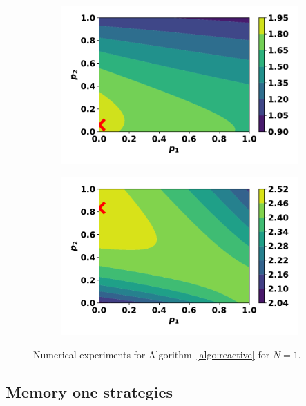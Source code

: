 \documentclass[10pt]{article}
\begin{document}
\begin{figure}
    \centering
    \begin{subfigure}{0.45\textwidth}
        \centering
        \includegraphics[width=.95\textwidth]{img/reactive_pairwise_one.pdf}
    \end{subfigure}
    \begin{subfigure}{0.45\textwidth}
        \centering
        \includegraphics[width=.95\textwidth]{img/reactive_pairwise_two.pdf}
    \end{subfigure}
    \caption{Numerical experiments for Algorithm~\ref{algo:reactive} for \(N=1\).}
    \label{fig:reactive_pairwise_results}
\end{figure}

\subsection{Memory one strategies}\label{section:mo_numerical}
\end{document}
